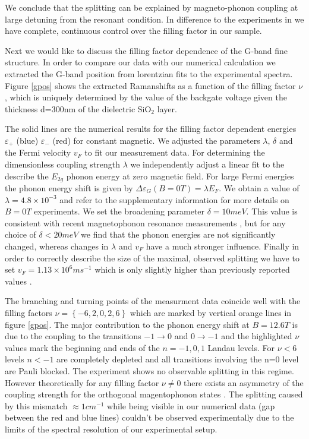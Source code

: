 \documentclass[prl,aps,superscriptaddress,reprint]{revtex4-1}
\begin{document}
We conclude that the splitting can be explained by magneto-phonon coupling at large detuning from the resonant condition. In difference to the experiments in \cite{PhysRevLett.110.227402,kossacki2012circular} we have complete, continuous control over the filling factor in our sample.  

Next we would like to discuss the filling factor dependence of the G-band fine structure. In order to compare our data with our numerical calculation we extracted the G-band position from lorentzian fits to the experimental spectra. Figure \ref{gpos} shows the extracted Ramanshifts as a function of the filling factor $\nu$, which is uniquely determined by the value of the backgate voltage given the thickness d=300nm of the dielectric SiO$_2$ layer. 


The solid lines are the numerical results for the filling factor dependent energies $\varepsilon_+$ (blue) $\varepsilon_-$ (red) for constant magnetic. We adjusted the parameters $\lambda$, $\delta$ and the Fermi velocity $v_F$ to fit our measurement data. For determining the dimensionless coupling strength $\lambda$ we independently adjust a linear fit to the describe the $E_{2g}$ phonon energy at zero magnetic field. For large Fermi energies the phonon energy shift is given by $\Delta \varepsilon_G\left(B=0T\right) = \lambda E_F$. We obtain a value of $\lambda = 4.8\times 10^{-3}$ and refer to the supplementary information for more details on $B=0T$ experiments.
We set the broadening parameter $\delta=10meV$. This value is consistent with recent magnetophonon resonance measurements \cite{kossacki2012circular}, but for any choice of $\delta < 20meV$ we find that the phonon energies are not significantly changed, whereas changes in $\lambda$ and $v_F$ have a much stronger influence.
Finally in order to correctly describe the size of the maximal, observed splitting we have to set $v_F = 1.13\times 10^6 ms^{-1}$ which is only slightly higher than previously reported values \cite{kossacki2012circular}.  

The branching and turning points of the measurment data coincide well with the filling factors $\nu=\left\lbrace -6,2,0,2,6 \right\rbrace$ which are marked by vertical orange lines in figure \ref{gpos}. The major contribution to the phonon energy shift at $B=12.6T$ is due to the coupling to the transitions $-1\rightarrow 0$ and $0\rightarrow -1$ and the highlighted $\nu$ values mark the beginning and ends of the $n=-1,0,1$ Landau levels.
For $\nu < 6$ levels $n < -1$ are completely depleted and all transitions involving the n=0 level are Pauli blocked. The experiment shows no observable splitting in this regime. However theoretically for any filling factor $\nu \neq 0$ there exists an asymmetry of the coupling strength for the orthogonal magentophonon states \cite{kossacki2012circular}. The splitting caused by this mismatch $\approx 1cm^{-1}$ while being visible in our numerical data (gap between the red and blue lines) couldn't be observed experimentally due to the limits of the spectral resolution of our experimental setup.  
\end{document}
